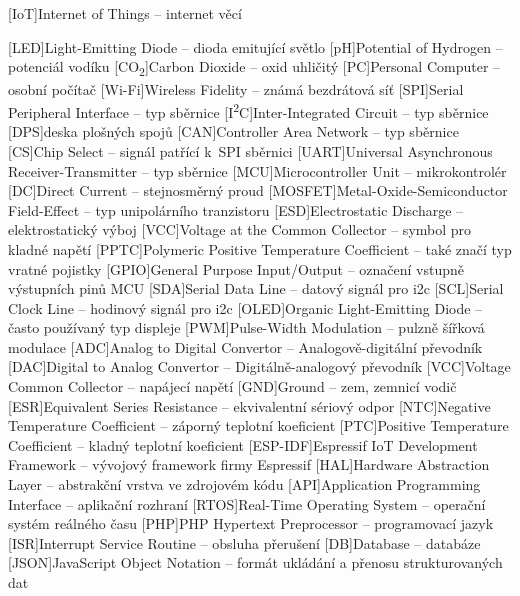 \cleardoublepage
\chapter*{\listofabbrevname}
{}

\begin{acronym}[iotasdasdsd]

	[IoT]{Internet of Things -- internet věcí}

	[LED]{Light-Emitting Diode -- dioda emitující světlo}
	[pH]{Potential of Hydrogen -- potenciál vodíku}
	[CO\textsubscript{2}]{Carbon Dioxide -- oxid uhličitý}
	[PC]{Personal Computer -- osobní počítač}
	[Wi-Fi]{Wireless Fidelity -- známá bezdrátová síť}
	[SPI]{Serial Peripheral Interface -- typ sběrnice}
	[I\textsuperscript{2}C]{Inter-Integrated Circuit -- typ sběrnice}
	[DPS]{deska plošných spojů}
	[CAN]{Controller Area Network -- typ sběrnice}
	[CS]{Chip Select -- signál patřící k~SPI sběrnici}
	[UART]{Universal Asynchronous Receiver-Transmitter -- typ sběrnice}
	[MCU]{Microcontroller Unit -- mikrokontrolér}
	[DC]{Direct Current -- stejnosměrný proud}
	[MOSFET]{Metal-Oxide-Semiconductor Field-Effect -- typ unipolárního tranzistoru}
	[ESD]{Electrostatic Discharge -- elektrostatický výboj}
	[VCC]{Voltage at the Common Collector -- symbol pro kladné napětí}
	[PPTC]{Polymeric Positive Temperature Coefficient -- také značí typ vratné pojistky}
	[GPIO]{General Purpose Input/Output -- označení vstupně výstupních pinů MCU}
	[SDA]{Serial Data Line -- datový signál pro \acs{i2c}}
	[SCL]{Serial Clock Line -- hodinový signál pro \acs{i2c}}
	[OLED]{Organic Light-Emitting Diode -- často používaný typ displeje}
	[PWM]{Pulse-Width Modulation -- pulzně šířková modulace}
	[ADC]{Analog to Digital Convertor -- Analogově-digitální převodník}
	[DAC]{Digital to Analog Convertor -- Digitálně-analogový převodník}
	[VCC]{Voltage Common Collector -- napájecí napětí}
	[GND]{Ground -- zem, zemnicí vodič}
	[ESR]{Equivalent Series Resistance -- ekvivalentní sériový odpor}
	[NTC]{Negative Temperature Coefficient -- záporný teplotní koeficient}
	[PTC]{Positive Temperature Coefficient -- kladný teplotní koeficient}
	[ESP-IDF]{Espressif IoT Development Framework -- vývojový framework firmy Espressif}
	[HAL]{Hardware Abstraction Layer -- abstrakční vrstva ve zdrojovém kódu}
	[API]{Application Programming Interface -- aplikační rozhraní}
	[RTOS]{Real-Time Operating System -- operační systém reálného času}
	[PHP]{PHP Hypertext Preprocessor -- programovací jazyk}
	[ISR]{Interrupt Service Routine -- obsluha přerušení}
	[DB]{Database -- databáze}
	[JSON]{JavaScript Object Notation -- formát ukládání a přenosu strukturovaných dat}

\end{acronym}
